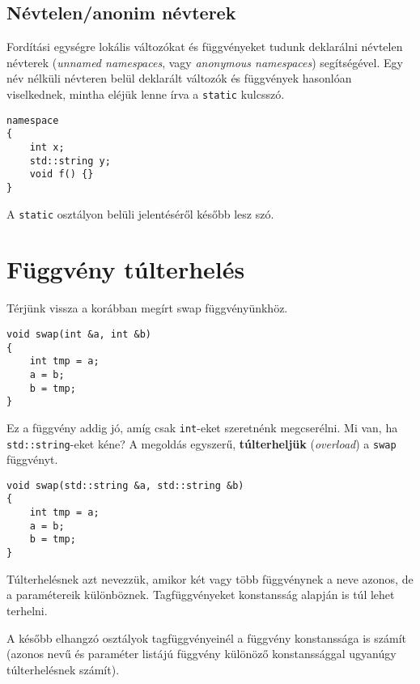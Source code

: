 \documentclass[a4paper,11.5pt,table]{article}
\begin{document}
	\subsection{Névtelen/anonim névterek}
	Fordítási egységre lokális változókat és függvényeket tudunk deklarálni névtelen névterek (\textit{unnamed namespaces}, vagy \textit{anonymous namespaces}) segítségével. Egy név nélküli névteren belül deklarált változók és függvények hasonlóan viselkednek, mintha eléjük lenne írva a \texttt{static} kulcsszó.
	\begin{lstlisting}
namespace
{
	int x;
	std::string y;
	void f() {}
}
	\end{lstlisting}
	\begin{note}
    A \texttt{static} osztályon belüli jelentéséről később lesz szó.
	\end{note}
	\section{Függvény túlterhelés}
	Térjünk vissza a korábban megírt swap függvényünkhöz.
	\begin{lstlisting}
void swap(int &a, int &b)
{
	int tmp = a;
	a = b;
	b = tmp;
}
	\end{lstlisting}
	Ez a függvény addig jó, amíg csak \texttt{int}-eket szeretnénk megcserélni. Mi van, ha \texttt{std::string}-eket kéne? A megoldás egyszerű, \textbf{túlterheljük} (\textit{overload}) a \texttt{swap} függvényt.
	\begin{lstlisting}
void swap(std::string &a, std::string &b)
{
	int tmp = a;
	a = b;
	b = tmp;
}
	\end{lstlisting}
	Túlterhelésnek azt nevezzük, amikor két vagy több függvénynek a neve azonos, de a paramétereik különböznek. Tagfüggvényeket konstansság alapján is túl lehet terhelni.
	\begin{note}
		A később elhangzó osztályok tagfüggvényeinél a függvény konstanssága is számít (azonos nevű és paraméter listájú függvény különöző konstanssággal ugyanúgy túlterhelésnek számít).
	\end{note}
\end{document}
